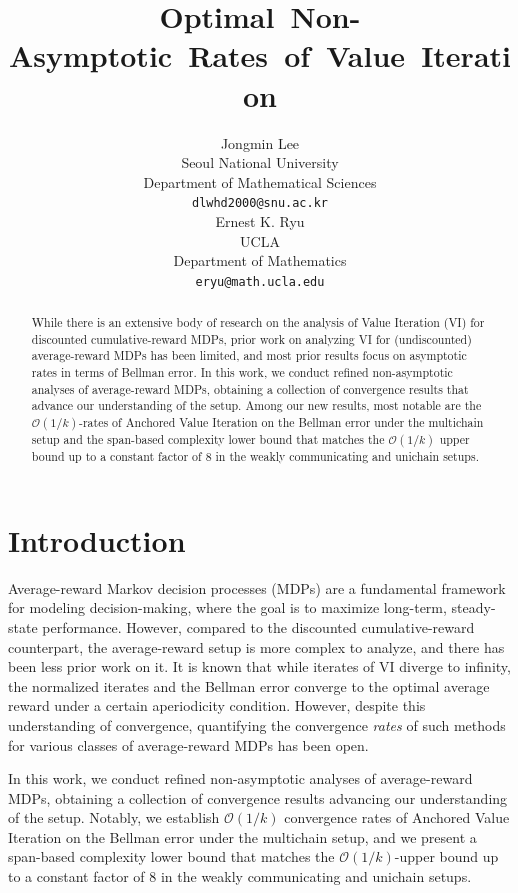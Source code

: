 \documentclass{article} %
\title{{\!\!\!\mbox{Optimal Non-Asymptotic Rates of Value Iteration}}\\
\makebox[0pt][l]{\!\!\!for Average-Reward MDPs}}
\author{Jongmin Lee\\
Seoul National University\\
Department of Mathematical Sciences\\
\texttt{dlwhd2000@snu.ac.kr} \\
\And
Ernest K. Ryu \\
UCLA \\
Department of Mathematics \\
\texttt{eryu@math.ucla.edu} 
}
\begin{document}
\maketitle

\vspace{-0.1in}

\begin{abstract}
While there is an extensive body of research on the analysis of Value Iteration (VI) for discounted cumulative-reward MDPs, prior work on analyzing VI for (undiscounted) average-reward MDPs has been limited, and most prior results focus on asymptotic rates in terms of Bellman error. In this work, we conduct refined non-asymptotic analyses of average-reward MDPs, obtaining a collection of convergence results that advance our understanding of the setup. Among our new results, most notable are the $\mathcal{O}(1/k)$-rates of Anchored Value Iteration on the Bellman error under the multichain setup and the span-based complexity lower bound that matches the $\mathcal{O}(1/k)$ upper bound up to a constant factor of $8$ in the weakly communicating and unichain setups.
\end{abstract}

\vspace{-0.06in}

\section{Introduction}

Average-reward Markov decision processes (MDPs) are a fundamental framework for modeling decision-making, where the goal is to maximize long-term, steady-state performance. However, compared to the discounted cumulative-reward counterpart, the average-reward setup is more complex to analyze, and there has been less prior work on it. It is known that while iterates of VI diverge to infinity, the normalized iterates and the Bellman error converge to the optimal average reward under a certain aperiodicity condition. However, despite this understanding of convergence, quantifying the convergence \emph{rates} of such methods for various classes of average-reward MDPs has been open.



In this work, we conduct refined non-asymptotic analyses of average-reward MDPs, obtaining a collection of convergence results advancing our understanding of the setup. Notably, we establish $\mathcal{O}(1/k)$ convergence rates of Anchored Value Iteration on the Bellman error under the multichain setup, and we present a span-based complexity lower bound that matches the $\mathcal{O}(1/k)$-upper bound up to a constant factor of  $8$ in the weakly communicating and unichain setups. 
\end{document}
